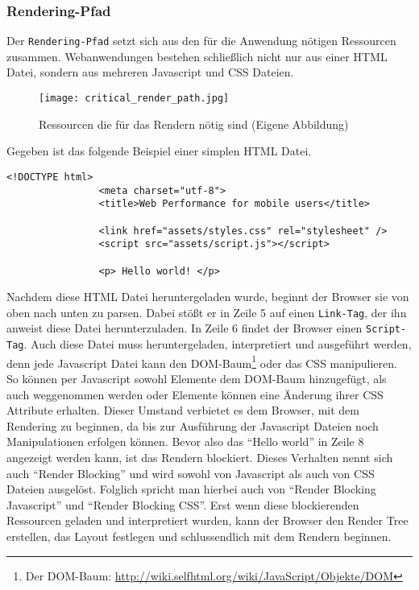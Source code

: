 

		\subsubsection{Rendering-Pfad} %
		\label{ssub:rendering_pfad}

			Der \texttt{Rendering-Pfad} setzt sich aus den für die Anwendung nötigen Ressourcen zusammen. Webanwendungen bestehen schließlich nicht nur aus einer HTML Datei, sondern aus mehreren Javascript und CSS Dateien.

			\begin{figure}[htbp]
				\begin{center}
					\texttt{[image: critical\_render\_path.jpg]}
					\caption{Ressourcen die für das Rendern nötig sind (Eigene Abbildung)}
					\label{fig:critical_render_path}
				\end{center}
			\end{figure}

			Gegeben ist das folgende Beispiel einer simplen HTML Datei.

			\begin{lstlisting}[captionpos=b, caption=Beispiel Code, label=beispielCode]
				<!DOCTYPE html>
				<meta charset="utf-8">
				<title>Web Performance for mobile users</title>

				<link href="assets/styles.css" rel="stylesheet" />
				<script src="assets/script.js"></script>

				<p> Hello world! </p>

			\end{lstlisting}

			Nachdem diese HTML Datei heruntergeladen wurde, beginnt der Browser sie von oben nach unten zu parsen. Dabei stößt er in Zeile 5 auf einen \texttt{Link-Tag}, der ihn anweist diese Datei herunterzuladen. In Zeile 6 findet der Browser einen \texttt{Script-Tag}. Auch diese Datei muss heruntergeladen, interpretiert und ausgeführt werden, denn jede Javascript Datei kann den DOM-Baum\footnote{Der DOM-Baum: \url{http://wiki.selfhtml.org/wiki/JavaScript/Objekte/DOM}} oder das CSS manipulieren. So können per Javascript sowohl Elemente dem DOM-Baum hinzugefügt, als auch weggenommen werden oder Elemente können eine Änderung ihrer CSS Attribute erhalten. Dieser Umstand verbietet es dem Browser, mit dem Rendering zu beginnen, da bis zur Ausführung der Javascript Dateien noch Manipulationen erfolgen können.
			Bevor also das "`Hello world"' in Zeile 8 angezeigt werden kann, ist das Rendern blockiert. Dieses Verhalten nennt sich auch "`Render Blocking"' und wird sowohl von Javascript als auch von CSS Dateien ausgelöst. Folglich spricht man hierbei auch von "`Render Blocking Javascript"' und "`Render Blocking CSS"'. Erst wenn diese blockierenden Ressourcen geladen und interpretiert wurden, kann der Browser den Render Tree erstellen, das Layout festlegen und schlussendlich mit dem Rendern beginnen. 

